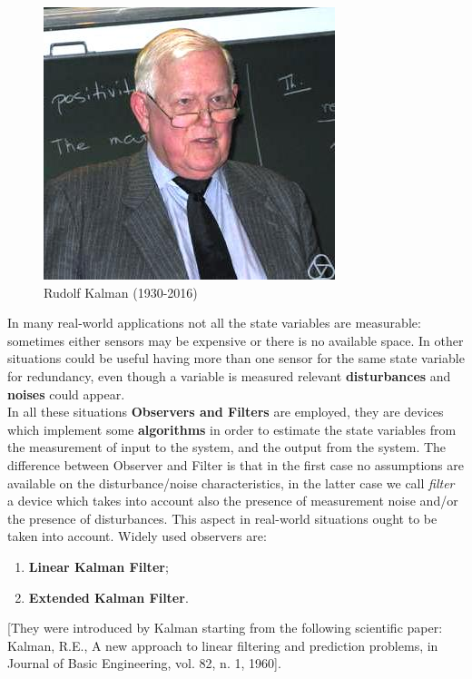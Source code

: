 \begin{figure}[h]
    \centering
    \includegraphics[scale=0.8]{AerospaceApplications/images/Kalman.jpg}
    \caption{Rudolf Kalman (1930-2016)}  
\end{figure}
\noindent
In many real-world applications not all the state variables are measurable: sometimes either sensors may be expensive or there is no available space. In other situations could be useful having more than one sensor for the same state variable for redundancy, even though a variable is measured relevant \textbf{disturbances} and \textbf{noises} could appear.\\

In all these situations \textbf{Observers and Filters} are employed, they are devices which implement some \textbf{algorithms} in order to estimate the state variables from the measurement of input to the system, and the output from the system. The difference between Observer and Filter is that in the first case no assumptions are available on the disturbance/noise characteristics, in the latter case we call \textit{filter} a device which takes into account also the presence of measurement noise and/or the presence of disturbances. This aspect in real-world situations ought to be taken into account. Widely used observers are:
\vspace{-0.2cm }
\begin{enumerate}
    \itemsep-0.2cm
    \item \textbf{Linear Kalman Filter}; 
    \item \textbf{Extended Kalman Filter}.
\end{enumerate}
[They were introduced by Kalman starting from the following scientific paper: \textsf{Kalman, R.E., A new approach to linear filtering and prediction problems, in Journal of Basic Engineering, vol. 82, n. 1, 1960}].

